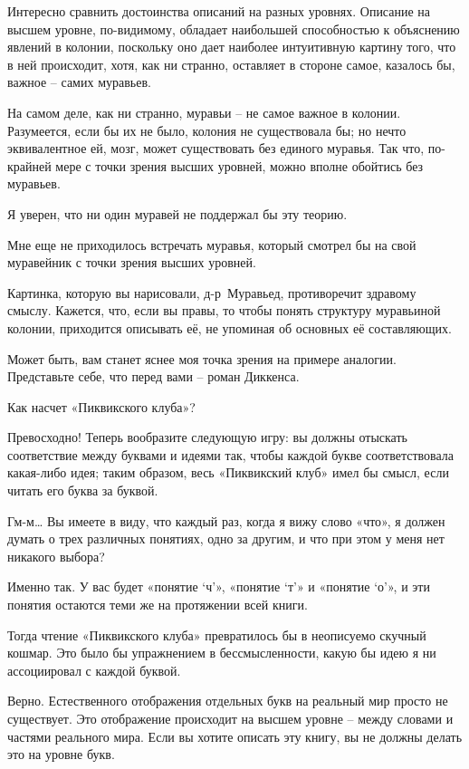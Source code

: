 \documentclass[../main.tex]{subfiles}
\begin{document}
\begin{dialogue}
 Интересно сравнить достоинства описаний на разных уровнях. Описание на высшем уровне, по-видимому, обладает наибольшей способностью к объяснению явлений в колонии, поскольку оно дает наиболее интуитивную картину того, что в ней происходит, хотя, как ни странно, оставляет в стороне самое, казалось бы, важное \--- самих муравьев.

 На самом деле, как ни странно, муравьи \--- не самое важное в колонии. Разумеется, если бы их не было, колония не существовала бы; но нечто эквивалентное ей, мозг, может существовать без единого муравья. Так что, по-крайней мере с точки зрения высших уровней, можно вполне обойтись без муравьев.

 Я уверен, что ни один муравей не поддержал бы эту теорию.

 Мне еще не приходилось встречать муравья, который смотрел бы на свой муравейник с точки зрения высших уровней.

 Картинка, которую вы нарисовали, д-р~Муравьед, противоречит здравому смыслу. Кажется, что, если вы правы, то чтобы понять структуру муравьиной колонии, приходится описывать её, не упоминая об основных её составляющих.

 Может быть, вам станет яснее моя точка зрения на примере аналогии. Представьте себе, что перед вами \--- роман Диккенса.

 Как насчет «Пиквикского клуба»?

 Превосходно! Теперь вообразите следующую игру: вы должны отыскать соответствие между буквами и идеями так, чтобы каждой букве соответствовала какая-либо идея; таким образом, весь «Пиквикский клуб» имел бы смысл, если читать его буква за буквой.

 Гм-м\ldots{} Вы имеете в виду, что каждый раз, когда я вижу слово «что», я должен думать о трех различных понятиях, одно за другим, и что при этом у меня нет никакого выбора?

 Именно так. У вас будет «понятие \enquote*{ч}», «понятие \enquote*{т}» и «понятие \enquote*{о}», и эти понятия остаются теми же на протяжении всей книги.

 Тогда чтение «Пиквикского клуба» превратилось бы в неописуемо скучный кошмар. Это было бы упражнением в бессмысленности, какую бы идею я ни ассоциировал с каждой буквой.

 Верно. Естественного отображения отдельных букв на реальный мир просто не существует. Это отображение происходит на высшем уровне \--- между словами и частями реального мира. Если вы хотите описать эту книгу, вы не должны делать это на уровне букв.


\end{dialogue}
\end{document}
